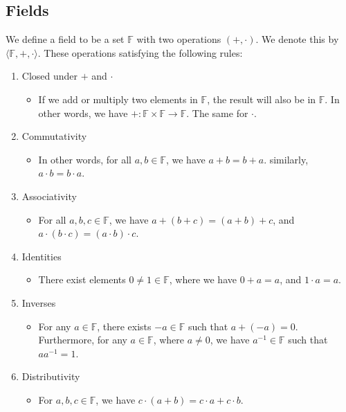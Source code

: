 \documentclass[openany]{book}
\begin{document}
	\subsection{Fields}
	\begin{defn}[Fields]
		We define a field to be a set $\mathbb{F}$ with two operations $\left( +, \cdot \right)$. We denote this by $\langle \mathbb{F}, +, \cdot\rangle$. These operations satisfying the following rules:
		\begin{enumerate}
			\item Closed under $+$ and $\cdot$
			\begin{itemize}
				\item If we add or multiply two elements in $\mathbb{F}$, the result will also be in $\mathbb{F}$. In other words, we have $+ : \mathbb{F} \times \mathbb{F} \rightarrow \mathbb{F}$. The same for $\cdot$.
			\end{itemize}
			
			\item Commutativity
			\begin{itemize}
				\item In other words, for all $a, b \in \mathbb{F}$, we have $a + b = b + a$. similarly, $a \cdot b = b \cdot a$.
			\end{itemize}
			
			\item Associativity
			\begin{itemize}
				\item For all $a, b, c \in \mathbb{F}$, we have $a + (b + c) = (a + b) + c$, and $a \cdot (b \cdot c) = (a \cdot b) \cdot c$.
			\end{itemize}
			
			\item Identities
			\begin{itemize}
				\item There exist elements $0 \not= 1 \in \mathbb{F}$, where we have $0 + a = a$, and $1 \cdot a = a$.
			\end{itemize}
			
			\item Inverses
			\begin{itemize}
				\item For any $a \in \mathbb{F}$, there exists $-a \in \mathbb{F}$ such that $a + (-a) = 0$. Furthermore, for any $a \in \mathbb{F}$, where $a \not=0$, we have $a^{-1} \in \mathbb{F}$ such that $aa^{-1} = 1$.
			\end{itemize}
			
			\item Distributivity
			\begin{itemize}
				\item For $a, b, c \in \mathbb{F}$, we have $c \cdot (a+b) = c \cdot a + c \cdot b$.
			\end{itemize}
		\end{enumerate}
	\end{defn}
	
\end{document}
